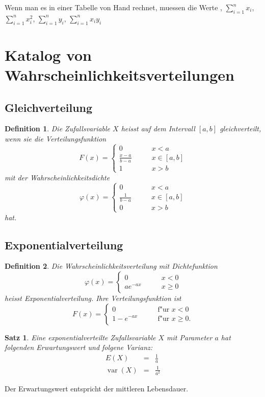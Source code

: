 \documentclass[ngerman, a4paper, 10pt, twocolumn, DIV20, headings=small]{scrartcl}
\newtheorem{definition}{Definition}
\newtheorem{satz}{Satz}
\begin{document}
Wenn man es in einer Tabelle von Hand rechnet, muessen die Werte , $\sum_{i=1}^nx_i$, $\sum_{i=1}^nx_i^2$, $\sum_{i=1}^ny_i$, $\sum_{i=1}^nx_iy_i$

\section{Katalog von Wahrscheinlichkeitsverteilungen}

\subsection{Gleichverteilung}

\begin{definition}Die Zufallsvariable $X$ heisst auf dem Intervall
$[a,b]$ gleichverteilt, wenn sie die Verteilungsfunktion
\[
F(x)=\begin{cases}
0&\qquad x< a\\
\frac{x-a}{b-a}&\qquad x\in[a,b]\\
1&\qquad x> b
\end{cases}
\]
mit der Wahrscheinlichkeitsdichte
\[
\varphi(x)=\begin{cases}
0&\qquad x< a\\
\frac1{b-a}&\qquad x\in[a,b]\\
0&\qquad x> b
\end{cases}
\]
hat.
\end{definition}

\subsection{Exponentialverteilung}
\begin{definition}
Die Wahrscheinlichkeitsverteilung mit Dichtefunktion
\[
\varphi(x)=\begin{cases}
0&\qquad x<0\\
a e^{-a x}&\qquad x\ge 0
\end{cases}
\]
heisst Exponentialverteilung. Ihre Verteilungsfunktion ist
\[
F(x)=\begin{cases}
0&\qquad\text{f"ur $x < 0$}\\
1-e^{-ax}&\qquad\text{f"ur $x\ge 0$}.
\end{cases}
\]
\end{definition}

\begin{satz}Eine exponentialverteilte Zufallsvariable $X$ mit Parameter
$a$ hat folgenden Erwartungswert und folgene Varianz:
\begin{eqnarray*}
E(X)&=&\frac1a\\
\operatorname{var}(X)&=&\frac1{a^2}
\end{eqnarray*}
\end{satz}
Der Erwartungswert entspricht der mittleren Lebensdauer.
\end{document}
